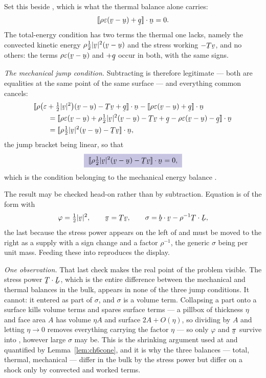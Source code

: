 \begin{solution}
Set this beside , which is what the thermal balance alone
carries:
\[
   \jump{\rho\varepsilon(\bv-\bu)+\bq}\cdot\bn=0 .
\]
The total-energy condition has two terms the thermal one lacks, namely
the convected kinetic energy $\rho\tfrac12|\bv|^{2}(\bv-\bu)$ and the
stress working $-\bT\bv$, and no others: the terms
$\rho\varepsilon(\bv-\bu)$ and $+\bq$ occur in both, with the same
signs.

\medskip
\noindent\emph{The mechanical jump condition.}
Subtracting is therefore legitimate --- both are equalities at the same
point of the same surface --- and everything common cancels:
\[
\begin{aligned}
   &\jump{\rho\big(\varepsilon+\tfrac12|\bv|^{2}\big)(\bv-\bu)
     -\bT\bv+\bq}\cdot\bn
    -\jump{\rho\varepsilon(\bv-\bu)+\bq}\cdot\bn\\
   &\qquad=\jump{\rho\varepsilon(\bv-\bu)
     +\rho\tfrac12|\bv|^{2}(\bv-\bu)-\bT\bv+\bq
     -\rho\varepsilon(\bv-\bu)-\bq}\cdot\bn\\
   &\qquad=\jump{\rho\tfrac12|\bv|^{2}(\bv-\bu)-\bT\bv}\cdot\bn ,
\end{aligned}
\]
the jump bracket being linear, so that
\[
   \boxed{\;\jump{\rho\tfrac12|\bv|^{2}(\bv-\bu)-\bT\bv}\cdot\bn=0 ,\;}
\]
which is the condition belonging to the mechanical energy balance
.

The result may be checked head-on rather than by subtraction. Equation
 is of the form  with
\[
   \varphi=\tfrac12|\bv|^{2},
   \qquad
   \vek\pi=\bT\bv,
   \qquad
   \sigma=\ip\bb\bv-\rho^{-1}\bT\cdot\bL ,
\]
the last because the stress power appears on the left of 
and must be moved to the right as a supply with a sign change and a
factor $\rho^{-1}$, the generic $\sigma$ being per unit mass. Feeding
these into  reproduces the display.

\medskip
\noindent\emph{One observation.}
That last check makes the real point of the problem visible. The stress
power $\bT\cdot\bL$, which is the entire difference between the
mechanical and thermal balances in the bulk, appears in none of the
three jump conditions. It cannot: it entered as part of $\sigma$, and
$\sigma$ is a volume term. Collapsing a part onto a surface kills
volume terms and spares surface terms --- a pillbox of thickness $\eta$
and face area $A$ has volume $\eta A$ and surface $2A+O(\eta)$, so
dividing by $A$ and letting $\eta\to0$ removes everything carrying the
factor $\eta$ --- so only $\varphi$ and $\vek\pi$ survive into
, however large $\sigma$ may be. This is the shrinking
argument used at  and quantified by
Lemma~\ref{lem:ch6cone}, and it is why the three balances --- total,
thermal, mechanical --- differ in the bulk by the stress power but
differ on a shock only by convected and worked terms.
\end{solution}

